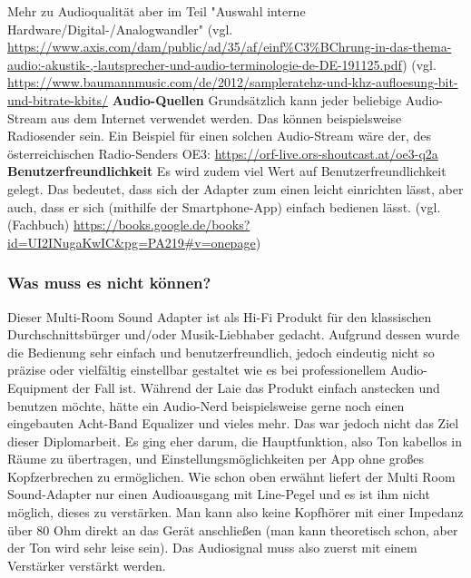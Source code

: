 \documentclass[11pt, twoside]{article}
\begin{document}
Mehr zu Audioqualität aber im Teil "Auswahl interne Hardware/Digital-/Analogwandler"
\vspace{4mm} \newline
(vgl. \url{https://www.axis.com/dam/public/ad/35/af/einf%C3%BChrung-in-das-thema-audio:-akustik-,-lautsprecher-und-audio-terminologie-de-DE-191125.pdf}) 
\newline
(vgl. \url{https://www.baumannmusic.com/de/2012/sampleratehz-und-khz-aufloesung-bit-und-bitrate-kbits/}
\vspace{4mm}\newline
\textbf{Audio-Quellen}\newline
Grundsätzlich kann jeder beliebige Audio-Stream aus dem Internet verwendet werden. Das können beispielsweise Radiosender sein.
Ein Beispiel für einen solchen Audio-Stream wäre der, des österreichischen Radio-Senders \glqq OE3\grqq{}: \newline
\url{https://orf-live.ors-shoutcast.at/oe3-q2a}
\vspace{4mm}\newline
\textbf{Benutzerfreundlichkeit}\newline
Es wird zudem viel Wert auf Benutzerfreundlichkeit gelegt. Das bedeutet, dass sich der Adapter zum einen leicht einrichten lässt, aber auch, dass er sich (mithilfe der Smartphone-App) einfach bedienen lässt.
\vspace{4mm} \newline
(vgl. (Fachbuch) \url{https://books.google.de/books?id=UI2INugaKwIC&pg=PA219#v=onepage})
\subsubsection{Was muss es nicht können?}
Dieser Multi-Room Sound Adapter ist als Hi-Fi Produkt für den klassischen Durchschnittsbürger und/oder Musik-Liebhaber gedacht. Aufgrund dessen wurde die Bedienung sehr einfach und benutzerfreundlich, jedoch eindeutig nicht so präzise oder vielfältig einstellbar gestaltet wie es bei professionellem Audio-Equipment der Fall ist. Während der Laie das Produkt einfach anstecken und benutzen möchte, hätte ein Audio-Nerd beispielsweise gerne noch einen eingebauten Acht-Band Equalizer und vieles mehr. Das war jedoch nicht das Ziel dieser Diplomarbeit. Es ging eher darum, die Hauptfunktion, also Ton kabellos in Räume zu übertragen, und Einstellungsmöglichkeiten per App ohne großes Kopfzerbrechen zu ermöglichen.\newline
Wie schon oben erwähnt liefert der Multi Room Sound-Adapter nur einen Audioausgang mit Line-Pegel und es ist ihm nicht möglich, dieses zu verstärken. Man kann also keine Kopfhörer mit einer Impedanz über 80 Ohm direkt an das Gerät anschließen (man kann theoretisch schon, aber der Ton wird sehr leise sein). Das Audiosignal muss also zuerst mit einem Verstärker verstärkt werden.\newline
\end{document}
